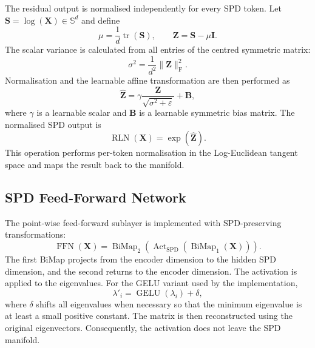 The residual output is normalised independently for every SPD token. Let
$\bm{S}=\log(\bm{X})\in\mathbb{S}^{d}$ and define
\begin{equation}
    \mu = \frac{1}{d}\operatorname{tr}(\bm{S}),\qquad
    \bm{Z}=\bm{S}-\mu\bm{I}.
\end{equation}
The scalar variance is calculated from all entries of the centred symmetric
matrix:
\begin{equation}
    \sigma^{2}
    =
    \frac{1}{d^{2}}\|\bm{Z}\|_{\mathrm{F}}^{2}.
\end{equation}
Normalisation and the learnable affine transformation are then performed as
\begin{equation}
    \widehat{\bm{Z}}
    =
    \gamma
    \frac{\bm{Z}}{\sqrt{\sigma^{2}+\varepsilon}}
    +\bm{B},
\end{equation}
where $\gamma$ is a learnable scalar and $\bm{B}$ is a learnable symmetric
bias matrix. The normalised SPD output is
\begin{equation}
    \operatorname{RLN}(\bm{X})=\exp(\widehat{\bm{Z}}).
\end{equation}
This operation performs per-token normalisation in the Log-Euclidean tangent
space and maps the result back to the manifold.

\subsection{SPD Feed-Forward Network}

The point-wise feed-forward sublayer is implemented with SPD-preserving
transformations:
\begin{equation}
    \operatorname{FFN}(\bm{X})
    =
    \operatorname{BiMap}_{2}
    \left(
        \operatorname{Act}_{\mathrm{SPD}}
        \left(\operatorname{BiMap}_{1}(\bm{X})\right)
    \right).
\end{equation}
The first BiMap projects from the encoder dimension to the hidden SPD
dimension, and the second returns to the encoder dimension. The activation is
applied to the eigenvalues. For the GELU variant used by the implementation,
\begin{equation}
    \lambda'_i
    =
    \operatorname{GELU}(\lambda_i)+\delta,
\end{equation}
where $\delta$ shifts all eigenvalues when necessary so that the minimum
eigenvalue is at least a small positive constant. The matrix is then
reconstructed using the original eigenvectors. Consequently, the activation
does not leave the SPD manifold.

